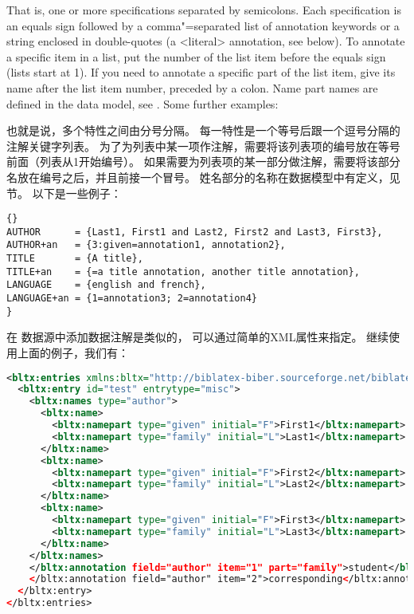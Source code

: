 That is, one or more specifications separated by semicolons. Each specification is an equals sign followed by a comma"=separated list of annotation keywords or a string enclosed in double-quotes (a <literal> annotation, see below). To annotate a specific item in a list, put the number of the list item before the equals sign (lists start at 1). If you need to annotate a specific part of the list item, give its name after the list item number, preceded by a colon. Name part names are defined in the data model, see . Some further examples:

也就是说，多个特性之间由分号分隔。
每一特性是一个等号后跟一个逗号分隔的注解关键字列表。
为了为列表中某一项作注解，需要将该列表项的编号放在等号前面（列表从1开始编号）。
如果需要为列表项的某一部分做注解，需要将该部分名放在编号之后，并且前接一个冒号。
姓名部分的名称在数据模型中有定义，见  节。
以下是一些例子：

\begin{lstlisting}[style=bibtex]{}
AUTHOR      = {Last1, First1 and Last2, First2 and Last3, First3},
AUTHOR+an   = {3:given=annotation1, annotation2},
TITLE       = {A title},
TITLE+an    = {=a title annotation, another title annotation},
LANGUAGE    = {english and french},
LANGUAGE+an = {1=annotation3; 2=annotation4}
}
\end{lstlisting}
%


在 \biblatexml 数据源中添加数据注解是类似的，
可以通过简单的XML属性来指定。
继续使用上面的例子，我们有：

\begin{lstlisting}[language=xml]
<bltx:entries xmlns:bltx="http://biblatex-biber.sourceforge.net/biblatexml">
  <bltx:entry id="test" entrytype="misc">
    <bltx:names type="author">
      <bltx:name>
        <bltx:namepart type="given" initial="F">First1</bltx:namepart>
        <bltx:namepart type="family" initial="L">Last1</bltx:namepart>
      </bltx:name>
      <bltx:name>
        <bltx:namepart type="given" initial="F">First2</bltx:namepart>
        <bltx:namepart type="family" initial="L">Last2</bltx:namepart>
      </bltx:name>
      <bltx:name>
        <bltx:namepart type="given" initial="F">First3</bltx:namepart>
        <bltx:namepart type="family" initial="L">Last3</bltx:namepart>
      </bltx:name>
    </bltx:names>
    </bltx:annotation field="author" item="1" part="family">student</bltx:annotation>
    </bltx:annotation field="author" item="2">corresponding</bltx:annotation>
  </bltx:entry>
</bltx:entries>
\end{lstlisting}
%

